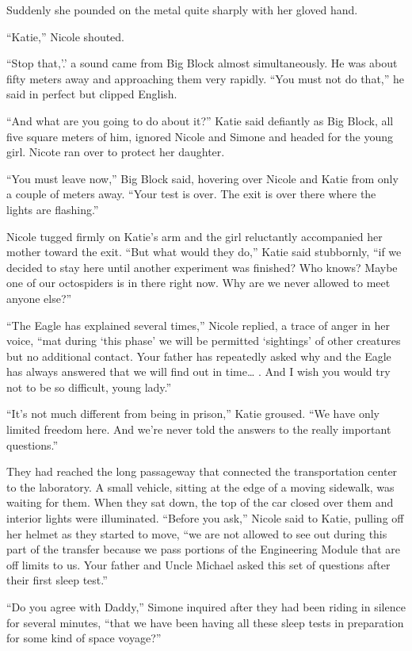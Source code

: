 \documentclass[]{article}
\begin{document}
{Suddenly she pounded on the metal quite sharply with her gloved hand.

“Katie,” Nicole shouted.

“Stop that,’.’ a sound came from Big Block almost simultaneously.  He was about fifty meters away and approaching them very rapidly.  “You must not do that,” he said in perfect but clipped English.

“And what are you going to do about it?” Katie said defiantly as Big Block, all five square meters of him, ignored Nicole and Simone and headed for the young girl.  Nicote ran over to protect her daughter.

“You must leave now,” Big Block said, hovering over Nicole and Katie from only a couple of meters away.  “Your test is over.  The exit is over there where the lights are flashing.”

Nicole tugged firmly on Katie’s arm and the girl reluctantly accompanied her mother toward the exit.  “But what would they do,” Katie said stubbornly, “if we decided to stay here until another experiment was finished? Who knows? Maybe one of our octospiders is in there right now.  Why are we never allowed to meet anyone else?”

“The Eagle has explained several times,” Nicole replied, a trace of anger in her voice, “mat during ‘this phase’ we will be permitted ‘sightings’ of other creatures but no additional contact.  Your father has repeatedly asked why and the Eagle has always answered that we will find out in time… .  And I wish you would try not to be so difficult, young lady.”

“It’s not much different from being in prison,” Katie groused.  “We have only limited freedom here.  And we’re never told the answers to the really important questions.”

They had reached the long passageway that connected the transportation center to the laboratory.  A small vehicle, sitting at the edge of a moving sidewalk, was waiting for them.  When they sat down, the top of the car closed over them and interior lights were illuminated.  “Before you ask,” Nicole said to Katie, pulling off her helmet as they started to move, “we are not allowed to see out during this part of the transfer because we pass portions of the Engineering Module that are off limits to us.  Your father and Uncle Michael asked this set of questions after their first sleep test.”

“Do you agree with Daddy,” Simone inquired after they had been riding in silence for several minutes, “that we have been having all these sleep tests in preparation for some kind of space voyage?”

}
\end{document}
